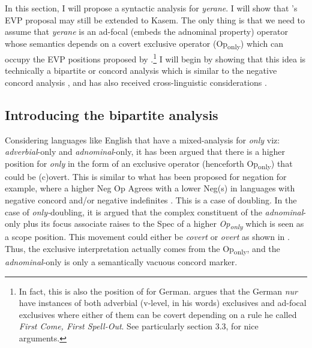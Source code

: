 \documentclass[output=paper,colorlinks,citecolor=brown,draftmode
]{langscibook}
\begin{document}
In this section, I will propose a syntactic analysis for \textit{yerane}. I will show that \citeauthor{buring2001syntax}'s \citeyearpar{buring2001syntax} EVP proposal may still be extended to Kasem. The only thing is that we need to assume that \textit{yerane} is an ad-focal (embeds the adnominal property) operator whose semantics depends on a covert exclusive operator (Op\textsubscript{only}) which can occupy the EVP positions proposed by \citet{buring2001syntax}.\footnote{In fact, this is also the position of \citet{hole2015distributed} for German. \citet{hole2015distributed} argues that the German \textit{nur} have instances of both adverbial (v-level, in his words) exclusives and ad-focal exclusives where either of them can be covert depending on a rule he called \textit{First Come, First Spell-Out}. See particularly \citet{hole2015distributed} section 3.3, for nice arguments.} I will begin by showing that this idea is technically a bipartite or concord analysis which is similar to the negative concord analysis \citep[cf.][a.o.]{zeijlstra2004sentential}, and has also received cross-linguistic considerations \citep[a.o.]{quek2017severing, sun2021bipartite, branan2023anti}.



\subsection{Introducing the bipartite analysis}
Considering languages like English that have a mixed-analysis for \textit{only} viz: \textit{adverbial}-only and \textit{adnominal}-only, it has been argued that there is a higher position for \textit{only} in the form of an exclusive operator (henceforth Op\textsubscript{only}) that could be (c)overt. This is similar to what has been proposed for negation for example, where a higher Neg Op Agrees with a lower Neg(s) in languages with negative concord and/or negative indefinites \citep[see a.o.,][]{zeijlstra2004sentential, zeijlstra2008negative, zeijlstra2011syntactically, penka2011negative}. This is a case of doubling. In the case of \textit{only-}doubling, it is argued that the complex constituent of the \textit{adnominal}-only plus its focus associate raises to the Spec of a higher \textit{Op\textsubscript{only}} which is seen as a scope position. This movement could either be \textit{covert} or \textit{overt} as shown in  \citep[cf.][]{bayer1996directionality, bayer1999bound, kayne1998overt, erlewine2018focus, sun2021bipartite}. Thus, the exclusive interpretation actually comes from the Op\textsubscript{only}, and the \textit{adnominal}-only is only a semantically vacuous concord marker.
\end{document}
